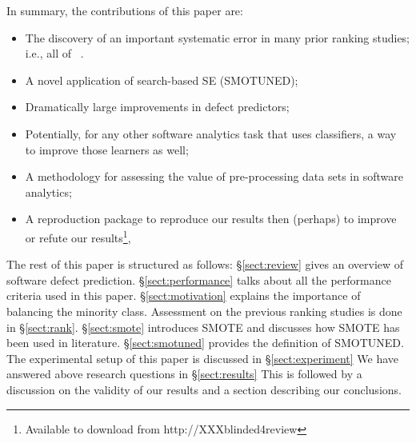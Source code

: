 \documentclass[10pt,conference]{IEEEtran}
\newcommand{\bi}{\begin{itemize}[leftmargin=0.4cm]}
\newcommand{\ei}{\end{itemize}}
\theoremstyle{break}
\theoremstyle{break}
\newcommand{\tion}[1]{{\S}\ref{sect:#1}}
\newcommand{\sma}{{\sc SMOTE}}
\newcommand{\smb}{{\sc SMOTUNED}}
\begin{document}
\newpage
\noindent
In summary, the  contributions of this paper are:
\bi
\item The discovery of an important systematic error in  many prior ranking studies; i.e., all of
~\cite{lessmann2008benchmarking,hall2012systematic,elish2008predicting,menzies2010defect,gondra2008applying,radjenovic2013software,jiang2008techniques,wang2013using,mende2009revisiting,li2012sample,khoshgoftaar2010attribute,jiang2009variance,ghotra2015revisiting,jiang2008can,tantithamthavorn2016automated,fu2016tuning}.
\item A novel application of search-based SE ({\smb});
\item Dramatically large improvements in  defect predictors;
\item Potentially, for any other software analytics task that uses classifiers, a way to improve those learners as well;
\item A methodology for assessing the value of pre-processing data sets in software analytics;
\item A reproduction package to reproduce our results then (perhaps) to improve or refute  our results\footnote{Available to download from http://XXXblinded4review},
\ei

The rest of this paper is structured as follows:
\tion{review} gives an overview of software defect prediction.
\tion{performance} talks about all the performance criteria used in this paper.
\tion{motivation} explains the importance of balancing the minority class. Assessment on the previous ranking studies is done in \tion{rank}.
\tion{smote} introduces {\sma} and discusses how {\sma} has been used in literature. \tion{smotuned} provides the definition of {\smb}. The experimental setup of this paper is discussed in \tion{experiment}
We have answered above research questions in
\tion{results} This is followed by a discussion on the validity of our results 
and a section describing our conclusions.
 


 


\end{document}
